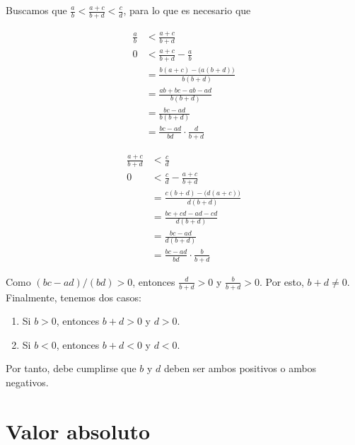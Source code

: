 \documentclass[11pt]{article}
\newcommand{\R}{\mathbb{R}}
\newcommand{\bfit}[1]{\textbf{\textit{#1}}}
\let\set\Set
\begin{document}
\begin{enumerate}[label=\alph*)]
    Buscamos que $\frac{a}{b}<\frac{a+c}{b+d}<\frac{c}{d}$, para lo que es necesario que
    \begin{center}\vspace{-2em}
    \begin{minipage}[l]{.5\linewidth}
    \begin{align*}
        \frac{a}{b} &< \frac{a+c}{b+d}\\
        0 &< \frac{a+c}{b+d} - \frac{a}{b}\\
        &= \frac{b(a+c)-\bigl(a(b+d)\bigr)}{b(b+d)}\\
        &= \frac{ab+bc-ab-ad}{b(b+d)}\\
        &= \frac{bc-ad}{b(b+d)}\\
        &= \frac{bc-ad}{bd} \cdot \frac{d}{b+d}
    \end{align*}
    \end{minipage}%
    \begin{minipage}[r]{.5\linewidth}
    \begin{align*}
        \frac{a+c}{b+d} &< \frac{c}{d}\\
        0 &< \frac{c}{d} -\frac{a+c}{b+d}\\
        &= \frac{c(b+d)-\bigl(d(a+c)\bigr)}{d(b+d)}\\
        &= \frac{bc+cd-ad-cd}{d(b+d)}\\
        &= \frac{bc-ad}{d(b+d)}\\
        &= \frac{bc-ad}{bd} \cdot \frac{b}{b+d}
    \end{align*}
    \end{minipage}
    \end{center}
    Como $(bc-ad)/(bd)>0$, entonces $\frac{d}{b+d}>0$ y $\frac{b}{b+d}>0$. Por esto, $b+d\neq 0$. Finalmente, tenemos dos casos: \begin{enumerate}[label=\roman*)]
        \item Si $b>0$, entonces $b+d>0$ y $d>0$.
        \item Si $b<0$, entonces $b+d<0$ y $d<0$.
    \end{enumerate}

    Por tanto, debe cumplirse que $b$ y $d$ deben ser ambos positivos o ambos negativos.

\end{enumerate}

\section*{Valor absoluto}
\end{document}
